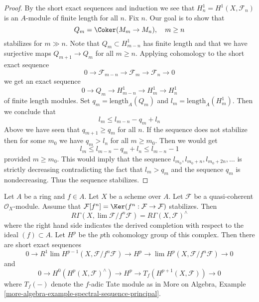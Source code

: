 \begin{proof}
By the short exact sequences and induction we see that
$H^1_n = H^1(X, \mathcal{F}_n)$ is an $A$-module of finite
length for all $n$. Fix $n$. Our goal is to show that
$$
Q_m = \Coker(M_m \to M_n),\quad m \geq n
$$
stabilizes for $m \gg n$. Note that $Q_m \subset H^1_{m - n}$ has finite length
and that we have surjective maps $Q_{m + 1} \to Q_m$ for all $m \geq n$.
Applying cohomology to the short exact sequence
$$
0 \to \mathcal{F}_{m - n} \to \mathcal{F}_m \to \mathcal{F}_n \to 0
$$
we get an exact sequence
$$
0 \to Q_m \to H^1_{m - n} \to H^1_m \to H^1_n
$$
of finite length modules.
Set $q_m = \text{length}_A(Q_m)$ and $l_m = \text{length}_A(H^1_m)$.
Then we conclude that
$$
l_m \leq l_{m - n} - q_m + l_n
$$
Above we have seen that $q_{m + 1} \geq q_m$ for all $n$. If the sequence
does not stabilize then for some $m_0$ we have $q_m > l_n$ for all
$m \geq m_0$. Then we would get
$$
l_m \leq l_{m - n} - q_m + l_n \leq l_{m - n} - 1
$$
provided $m \geq m_0$. This would imply that the sequence
$l_{m_0}, l_{m_0 + n}, l_{m_0 + 2n}, \ldots$ is strictly decreasing
contradicting the fact that $l_m > q_m$ and the sequence $q_m$
is nondecreasing. Thus the sequence stabilizes.
\end{proof}

\begin{lemma}
\label{lemma-formal-functions}
\begin{reference}
\cite[Lemma 1.6]{Bhatt-local}
\end{reference}
Let $A$ be a ring and $f \in A$. Let $X$ be a scheme over $A$.
Let $\mathcal{F}$ be a quasi-coherent $\mathcal{O}_X$-module.
Assume that $\mathcal{F}[f^n] = \Ker(f^n : \mathcal{F} \to \mathcal{F})$
stabilizes. Then
$$
R\Gamma(X, \lim \mathcal{F}/f^n\mathcal{F}) =
R\Gamma(X, \mathcal{F})^\wedge
$$
where the right hand side indicates the derived completion
with respect to the ideal $(f) \subset A$. Let $H^p$ be the
$p$th cohomology group of this complex. Then there are short
exact sequences
$$
0 \to R^1\lim H^{p - 1}(X, \mathcal{F}/f^n\mathcal{F})
\to H^p \to \lim H^p(X, \mathcal{F}/f^n\mathcal{F}) \to 0
$$
and
$$
0 \to H^0(H^p(X, \mathcal{F})^\wedge) \to H^p \to
T_f(H^{p + 1}(X, \mathcal{F})) \to 0
$$
where $T_f(-)$ denote the $f$-adic Tate module as in
More on Algebra, Example
\ref{more-algebra-example-spectral-sequence-principal}.
\end{lemma}

